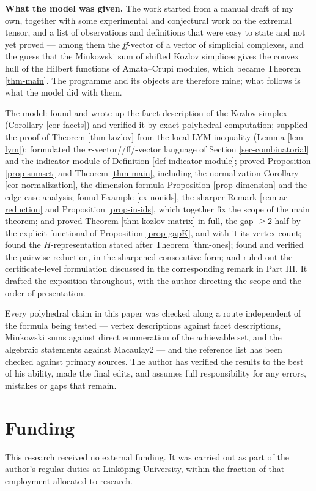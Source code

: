 \documentclass[11pt, a4paper, abstract=yes]{scrartcl}
\theoremstyle{definition}
\theoremstyle{remark}
\theoremstyle{plain}
\begin{document}
\textbf{What the model was given.} The work started from a manual draft of my own, together with some
experimental and conjectural work on the extremal tensor, and a list of observations and
definitions that were easy to state and not yet proved --- among them the \emph{ff}-vector of a vector
of simplicial complexes, and the guess that the Minkowski sum of shifted Kozlov simplices gives the
convex hull of the Hilbert functions of Amata--Crupi modules, which became Theorem \ref{thm-main}.
The programme and its objects are therefore mine; what follows is what the model did with them.

The model: found and wrote up the facet description of the Kozlov simplex (Corollary \ref{cor-facets})
and verified it by exact polyhedral computation; supplied the proof of Theorem \ref{thm-kozlov} from the
local LYM inequality (Lemma \ref{lem-lym}); formulated the \(r\)-vector//ff/-vector language of
Section \ref{sec-combinatorial} and the indicator module of Definition \ref{def-indicator-module}; proved
Proposition \ref{prop-sumset} and Theorem \ref{thm-main}, including the normalization
Corollary \ref{cor-normalization}, the dimension formula Proposition \ref{prop-dimension} and the edge-case
analysis; found Example \ref{ex-nonids}, the sharper Remark \ref{rem-ac-reduction} and
Proposition \ref{prop-in-ids}, which together fix the scope of the main theorem; and proved Theorem \ref{thm-kozlov-matrix} in full, the
gap-\(\ge2\) half by the explicit functional of Proposition \ref{prop-gapK}, and with it
its vertex count; found the \(H\)-representation stated after Theorem \ref{thm-ones}; found and
verified the pairwise reduction, in the sharpened consecutive form; and ruled out the
certificate-level formulation discussed in the corresponding remark in Part III. It
drafted the exposition throughout, with the author directing the scope and the order of
presentation.

Every polyhedral claim in this paper was checked along a route independent of the formula being
tested --- vertex descriptions against facet descriptions, Minkowski sums against direct enumeration
of the achievable set, and the algebraic statements against Macaulay2 --- and the reference list has
been checked against primary sources. The author has verified the results to the best of his ability,
made the final edits, and assumes full responsibility for any errors, mistakes or gaps that remain.
\section*{Funding}
\label{sec:org22fb57a}
This research received no external funding. It was carried out as part of the author's regular duties
at Linköping University, within the fraction of that employment allocated to research.
\end{document}
